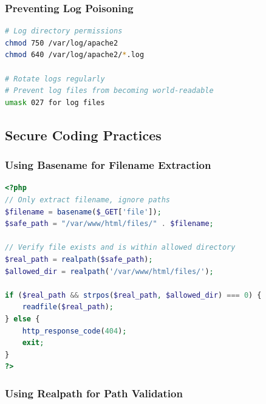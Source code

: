 \documentclass[12pt]{article}
\begin{document}
\subsubsection{Preventing Log Poisoning}

\begin{lstlisting}[language=bash, caption=Protecting Log Files]
# Log directory permissions
chmod 750 /var/log/apache2
chmod 640 /var/log/apache2/*.log

# Rotate logs regularly
# Prevent log files from becoming world-readable
umask 027 for log files
\end{lstlisting}

\subsection{Secure Coding Practices}

\subsubsection{Using Basename for Filename Extraction}

\begin{lstlisting}[language=PHP, caption=Secure File Name Handling]
<?php
// Only extract filename, ignore paths
$filename = basename($_GET['file']);
$safe_path = "/var/www/html/files/" . $filename;

// Verify file exists and is within allowed directory
$real_path = realpath($safe_path);
$allowed_dir = realpath('/var/www/html/files/');

if ($real_path && strpos($real_path, $allowed_dir) === 0) {
    readfile($real_path);
} else {
    http_response_code(404);
    exit;
}
?>
\end{lstlisting}

\subsubsection{Using Realpath for Path Validation}
\end{document}
